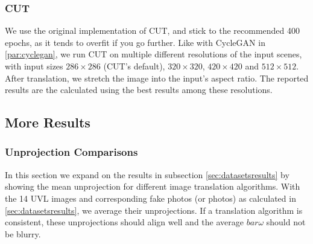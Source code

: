 	\subsubsection{CUT}
	\label{par:cut}
	We use the original implementation of CUT, and stick to the recommended 400 epochs, as it tends to overfit if you go further. 
	Like with CycleGAN in \ref{par:cyclegan}, we run CUT on multiple different resolutions of the input scenes, with input sizes $286\times286$ (CUT's default), $320\times320$, $420\times420$ and $512\times512$. 
	After translation, we stretch the image into the input's aspect ratio.
	The reported results are the calculated using the best results among these resolutions.

\subsection{More Results}

	\subsubsection{Unprojection Comparisons}

		In this section we expand on the results in subsection \ref{sec:datasetsresults} by showing the mean unprojection for different image translation algorithms. With the 14 UVL images and corresponding fake photos (or photos) as calculated in \ref{sec:datasetsresults}, we average their unprojections.
		If a translation algorithm is consistent, these unprojections should align well and the average $bar{\omega}$ should not be blurry.

